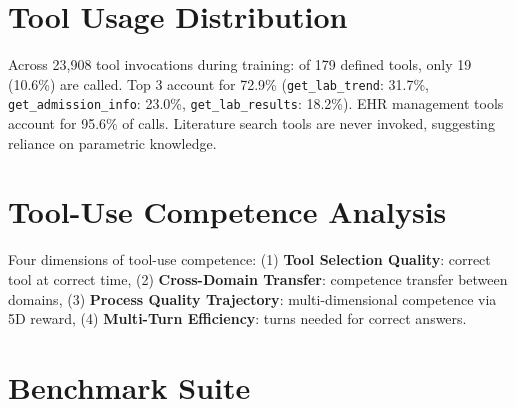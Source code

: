 \documentclass{article}
\begin{document}
\section{Tool Usage Distribution}
\label{app:tool_distribution}

Across 23,908 tool invocations during training: of 179 defined tools, only 19 (10.6\%) are called. Top 3 account for 72.9\% (\texttt{get\_lab\_trend}: 31.7\%, \texttt{get\_admission\_info}: 23.0\%, \texttt{get\_lab\_results}: 18.2\%). EHR management tools account for 95.6\% of calls. Literature search tools are never invoked, suggesting reliance on parametric knowledge.


\section{Tool-Use Competence Analysis}
\label{app:tool_competence}

Four dimensions of tool-use competence: (1) \textbf{Tool Selection Quality}: correct tool at correct time, (2) \textbf{Cross-Domain Transfer}: competence transfer between domains, (3) \textbf{Process Quality Trajectory}: multi-dimensional competence via 5D reward, (4) \textbf{Multi-Turn Efficiency}: turns needed for correct answers.


\section{Benchmark Suite}
\label{app:benchmarks}
\end{document}
